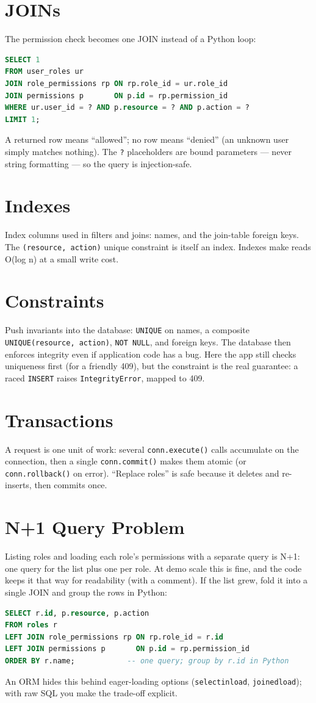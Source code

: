 \documentclass[11pt,a4paper]{report}
\begin{document}
\section{JOINs}
The permission check becomes one JOIN instead of a Python loop:
\begin{lstlisting}[language=SQL]
SELECT 1
FROM user_roles ur
JOIN role_permissions rp ON rp.role_id = ur.role_id
JOIN permissions p       ON p.id = rp.permission_id
WHERE ur.user_id = ? AND p.resource = ? AND p.action = ?
LIMIT 1;
\end{lstlisting}
A returned row means ``allowed''; no row means ``denied'' (an unknown user simply
matches nothing). The \texttt{?} placeholders are bound parameters --- never
string formatting --- so the query is injection-safe.

\section{Indexes}
Index columns used in filters and joins: names, and the join-table foreign keys.
The \texttt{(resource, action)} unique constraint is itself an index. Indexes make
reads O(log n) at a small write cost.

\section{Constraints}
Push invariants into the database: \texttt{UNIQUE} on names, a composite
\texttt{UNIQUE(resource, action)}, \texttt{NOT NULL}, and foreign keys. The
database then enforces integrity even if application code has a bug. Here the app
still checks uniqueness first (for a friendly 409), but the constraint is the real
guarantee: a raced \texttt{INSERT} raises \texttt{IntegrityError}, mapped to 409.

\section{Transactions}
A request is one unit of work: several \texttt{conn.execute()} calls accumulate on
the connection, then a single \texttt{conn.commit()} makes them atomic (or
\texttt{conn.rollback()} on error). ``Replace roles'' is safe because it deletes
and re-inserts, then commits once.

\section{N+1 Query Problem}
Listing roles and loading each role's permissions with a separate query is N+1:
one query for the list plus one per role. At demo scale this is fine, and the code
keeps it that way for readability (with a comment). If the list grew, fold it into
a single JOIN and group the rows in Python:
\begin{lstlisting}[language=SQL]
SELECT r.id, p.resource, p.action
FROM roles r
LEFT JOIN role_permissions rp ON rp.role_id = r.id
LEFT JOIN permissions p       ON p.id = rp.permission_id
ORDER BY r.name;            -- one query; group by r.id in Python
\end{lstlisting}
An ORM hides this behind eager-loading options (\texttt{selectinload},
\texttt{joinedload}); with raw SQL you make the trade-off explicit.
\end{document}
